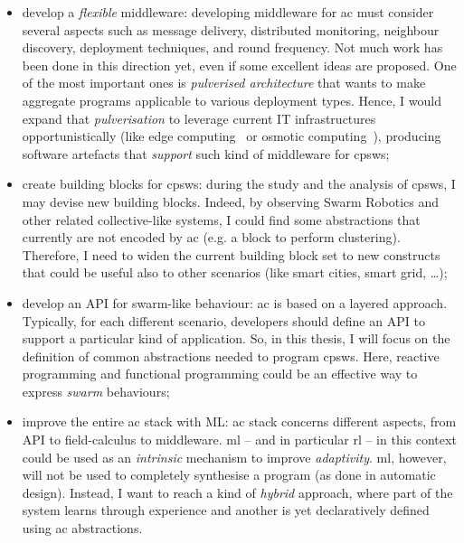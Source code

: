 \documentclass[11pt]{article}
\begin{document}
\begin{itemize}
	\item develop a \textit{flexible} middleware: 
	developing middleware for \ac{ac} must consider several aspects such as message delivery, distributed monitoring, neighbour discovery, deployment techniques, and round frequency. 
	Not much work has been done in this direction yet, even if some excellent ideas are proposed.
	One of the most important ones is \emph{pulverised architecture}\cite{DBLP:journals/fi/CasadeiPPVW20} that wants to make aggregate programs applicable to various deployment types.
	Hence, I would expand that \emph{pulverisation} to leverage current IT infrastructures opportunistically (like edge computing~\cite{DBLP:journals/computer/Satyanarayanan17} or osmotic computing~\cite{DBLP:journals/cloudcomp/VillariFDRR16}), producing software artefacts that \textit{support} such kind of middleware for \acp{cpsw};
	\item create building blocks for \acp{cpsw}: during the study and the analysis of \acp{cpsw}, I may devise new building blocks. 
	Indeed, by observing Swarm Robotics and other related collective-like systems, I could find some abstractions that currently are not encoded by \ac{ac} (e.g. a block to perform clustering).
	Therefore, I need to widen the current building block set to new constructs that could be useful also to other scenarios (like smart cities, smart grid, \dots{});
	\item develop an API for swarm-like behaviour: \ac{ac} is based on a layered approach. 
	Typically, for each different scenario, developers should define an API to support a particular kind of application. 
	So, in this thesis, I will focus on the definition of common abstractions needed to program \acp{cpsw}. 
	Here, reactive programming and functional programming could be an effective way to express \textit{swarm} behaviours; %
	\item improve the entire \ac{ac} stack with ML: \ac{ac} stack concerns different aspects, from API to field-calculus to middleware. 
	\ac{ml} -- and in particular \ac{rl} -- in this context could be used as an \emph{intrinsic} mechanism to improve \emph{adaptivity}.
	\ac{ml}, however, will not be used to completely synthesise a program (as done in automatic design). Instead, I want to reach a kind of \textit{hybrid} approach, where part of the system learns through experience and another is yet declaratively defined using \ac{ac} abstractions.
\end{itemize}
\end{document}

